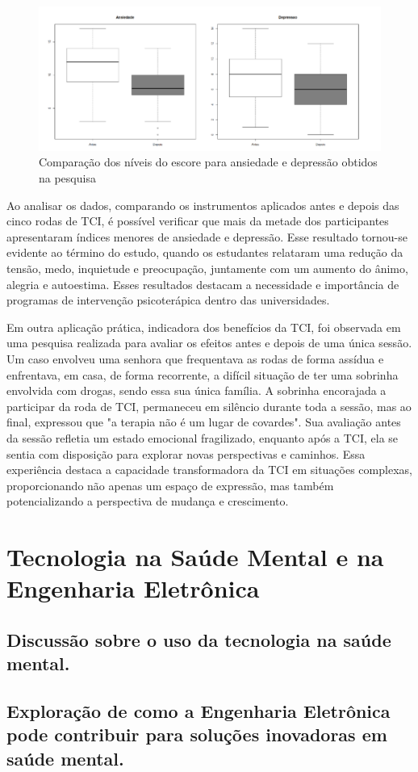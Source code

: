 \begin{figure}[!h] %
    \centering
    \includegraphics[scale=0.5]{latex/figuras/boaretto.pdf}
    \caption[Terapia Comunitária Integrativa]%
    {Comparação dos níveis do escore para ansiedade e depressão obtidos na pesquisa\cite{BOARETTO}}%
\end{figure}

Ao analisar os dados, comparando os instrumentos aplicados antes e depois das cinco rodas de TCI, é possível verificar que mais da metade dos participantes apresentaram índices menores de ansiedade e depressão. Esse resultado tornou-se evidente ao término do estudo, quando os estudantes relataram uma redução da tensão, medo, inquietude e preocupação, juntamente com um aumento do ânimo, alegria e autoestima. Esses resultados destacam a necessidade e importância de programas de intervenção psicoterápica dentro das universidades.\cite{BOARETTO}

Em outra aplicação prática, indicadora dos benefícios da TCI, foi observada em uma pesquisa realizada para avaliar os efeitos antes e depois de uma única sessão. Um caso envolveu uma senhora que frequentava as rodas de forma assídua e enfrentava, em casa, de forma recorrente, a difícil situação de ter uma sobrinha envolvida com drogas, sendo essa sua única família. A sobrinha encorajada a participar da roda de TCI, permaneceu em silêncio durante toda a sessão, mas ao final, expressou que "a terapia não é um lugar de covardes". Sua avaliação antes da sessão refletia um estado emocional fragilizado, enquanto após a TCI, ela se sentia com disposição para explorar novas perspectivas e caminhos. Essa experiência destaca a capacidade transformadora da TCI em situações complexas, proporcionando não apenas um espaço de expressão, mas também potencializando a perspectiva de mudança e crescimento. \cite{LEITEePALOS}




\chapter{Tecnologia na Saúde Mental e na Engenharia Eletrônica}

\section{Discussão sobre o uso da tecnologia na saúde mental.}
\section{Exploração de como a Engenharia Eletrônica pode contribuir para soluções inovadoras em saúde mental.}
